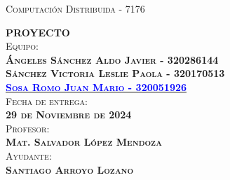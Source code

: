 \begin{titlepage}
\begin{minipage}[c][0.81\textheight][t]{0.75\textwidth}
\begin{center}
			{\large\scshape Computación Distribuida - 7176}\\[.2in]
			
			\vspace{2cm}            
			
			\textsc{\LARGE \textbf{P}\hspace{1cm}\textbf{R}\hspace{1cm}\textbf{O}\hspace{1cm}\textbf{Y}\hspace{1cm}\textbf{E}\hspace{1cm}\textbf{C}\hspace{1cm}\textbf{T}\hspace{1cm}\textbf{O}}\\[2cm]

			\textsc{\Large{Equipo:}\normalsize \\
                \vspace{.3cm}
				\textbf{Ángeles Sánchez Aldo Javier - 320286144 \\
				\vspace{.2cm}
				Sánchez Victoria Leslie Paola - 320170513 \\
				\vspace{.2cm}
				\href{https://github.com/JuanSosaCiencias}{\textcolor{blue}{Sosa Romo Juan Mario - 320051926}} }}\\[0.5cm]     
			
			\textsc{{Fecha de entrega: \\ \textbf{29 de Noviembre de 2024}}}\\[0.5cm]        
			
			\textsc{{Profesor: \\ \textbf{Mat. Salvador López Mendoza}}}\\[0.5cm]  
			
			\textsc{Ayudante: \\ \textbf{Santiago Arroyo Lozano } }
			
			
			\vspace{0.5cm}
		\end{center}
	\end{minipage}
\end{titlepage}
